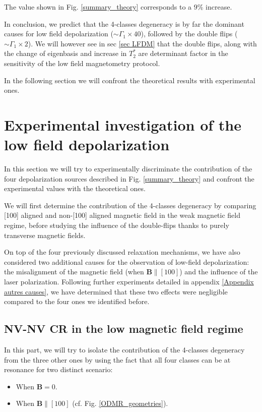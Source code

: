 \documentclass[a4paper, 11pt]{report}
\begin{document}
The value shown in Fig. \ref{summary_theory} corresponds to a $9 \%$ increase.

\bigskip

In conclusion, we predict that the 4-classes degeneracy is by far the dominant causes for low field depolarization ($\sim \Gamma_1 \times 40$), followed by the double flips ($\sim \Gamma_1 \times 2$). We will however see in sec \ref{sec LFDM} that the double flips, along with the change of eigenbasis and increase in $T_2^*$ are determinant factor in the sensitivity of the low field magnetometry protocol.

In the following section we will confront the theoretical results with experimental ones.

\section{Experimental investigation of the low field depolarization}
\label{sec 4.3}
In this section we will try to experimentally discriminate the contribution of the four depolarization sources described in Fig. \ref{summary_theory} and confront the experimental values with the theoretical ones. 

We will first determine the contribution of the 4-classes degeneracy by comparing [100] aligned and non-[100] aligned magnetic field in the weak magnetic field regime, before studying the influence of the double-flips thanks to purely transverse magnetic fields.

On top of the four previously discussed relaxation mechanisms, we have also considered two additional causes for the observation of low-field depolarization: the misalignment of the magnetic field (when $\mathbf{B}\parallel [100]$) and the influence of the laser polarization. Following further experiments detailed in appendix \ref{Appendix autres causes}, we have determined that these two effects were negligible compared to the four ones we identified before.

\subsection{NV-NV CR in the low magnetic field regime}


In this part, we will try to isolate the contribution of the 4-classes degeneracy from the three other ones by using the fact that all four classes can be at resonance for two distinct scenario:
\begin{itemize}
\item When $\mathbf{B}=0$.
\item When $\mathbf{B}\parallel [100]$ (cf. Fig. \ref{ODMR_geometries}).
\end{itemize}
\end{document}
